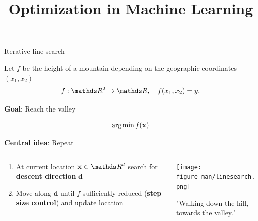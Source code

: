 \documentclass[11pt,compress,t,notes=noshow, xcolor=table]{beamer}
\title{Optimization in Machine Learning}
\date{}
\begin{document}
\sloppy

\begin{vbframe}{Iterative line search}

	Let $f$ be the height of a mountain depending on the geographic coordinates $(x_1, x_2)$
	\vspace*{-0.1cm}
	$$
	f: \R^2 \to \R, \quad f(x_1, x_2) = y.
	$$
	
	\textbf{Goal}: Reach the valley

	$$
	\operatorname{arg\,min} f(\mathbf{x})
	$$
	
	\textbf{Central idea}: Repeat
	\vspace*{-0.15cm}
	\begin{columns}
		\begin{column}{0.58\textwidth}
			\begin{enumerate}
				\item At current location $\xv \in \R^d$ search for \textbf{descent direction} $\mathbf{d}$ 
			  	\item Move along $\mathbf{d}$ until $f$ sufficiently reduced (\textbf{step size control}) and update location
			\end{enumerate}
		\end{column}
		\begin{column}{0.4\textwidth}
			\begin{center}
			\texttt{[image: figure\_man/linesearch.png]}
			\hspace{2cm} \begin{footnotesize} "Walking down the hill, towards the valley." \end{footnotesize}\\
			\end{center}
		\end{column}
	\end{columns}
	
\end{vbframe}
\end{document}
